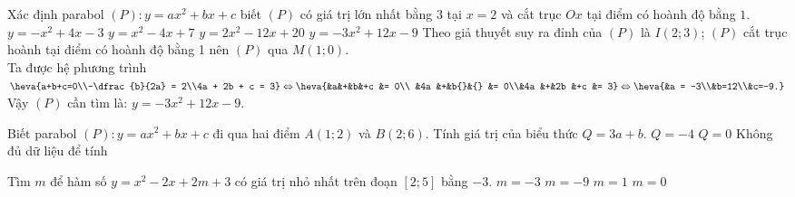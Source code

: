 \begin{ex}%
	Xác định parabol $(P):y=ax^2+bx+c$  biết $(P)$ có giá trị lớn nhất bằng $3$ tại $x=2$ và cắt trục $Ox$ tại điểm có hoành độ bằng $1$.
	\choice
	{ $y=-x^2+4x-3$}
	{ $y=x^2-4x+7$}
	{ $y=2x^2-12x+20$}
	{\True  $y=-3x^2+12x-9$}
	\loigiai
	{Theo giả thuyết suy ra đỉnh của $ (P) $ là $ I(2;3) $; $ (P) $ cắt trục hoành tại điểm có hoành độ bằng 1 nên $ (P)  $ qua $ M(1;0) $.\\
		Ta được hệ phương trình $ \heva{a+b+c=0\\-\dfrac{b}{2a} = 2\\4a + 2b + c = 3} \Leftrightarrow \heva{&a&+&b&+c &= 0\\ &4a &+&b{}&{} &= 0\\&4a &+&2b &+c &= 3} \Leftrightarrow \heva{&a = -3\\&b=12\\&c=-9.} $\\
		Vậy $ (P) $ cần tìm là: $y=-3x^2+12x-9.  $
	}
\end{ex}

\begin{ex}%
	Biết parabol $(P) : y = ax^2 +bx + c$ đi qua hai điểm $A(1; 2)$ và $B(2;6)$. Tính giá trị của biểu thức $Q=3a + b$.
	{$Q=-4$}
	{$Q=0$}
	{Không đủ dữ liệu để tính}
\end{ex}

\begin{ex}%
	Tìm $m$ để hàm số $y=x^2-2x+2m+3$ có giá trị nhỏ nhất trên đoạn $[2;5]$ bằng $-3$.
	\choice        
	{\True $m=-3$}
	{$m=-9$}
	{$m=1$}
	{$m=0$}
\end{ex}

